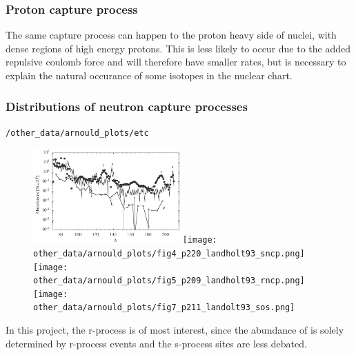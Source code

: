 \subsubsection{Proton capture process}
The same capture process can happen to the proton heavy side of nuclei, with dense regions of high energy protons. This is less likely to occur due to the added repulsive coulomb force and will therefore have smaller rates, but is necessary to explain the natural occurance of some isotopes in the nuclear chart.

\subsubsection{Distributions of neutron capture processes} \label{sec:nuclear-processes-distributions}
 \verb|/other_data/arnould_plots/etc|

\begin{figure}
  \includegraphics[width=0.5\textwidth]{other_data/arnould_plots/fig1_p100_arnould07_process_decomp.jpg}
  \texttt{[image: other\_data/arnould\_plots/fig4\_p220\_landholt93\_sncp.png]}
  \texttt{[image: other\_data/arnould\_plots/fig5\_p209\_landholt93\_rncp.png]}
  \texttt{[image: other\_data/arnould\_plots/fig7\_p211\_landolt93\_sos.png]}
\end{figure}

In this project, the r-process is of most interest, since the abundance of  is solely determined by r-process events and the s-process sites are less debated.

\begin{figure}
  \begin{minipage}{0.49\textwidth}
    
  \end{minipage}
  \begin{minipage}{0.49\textwidth}
    
    
  \end{minipage}
\end{figure}

\FloatBarrier

